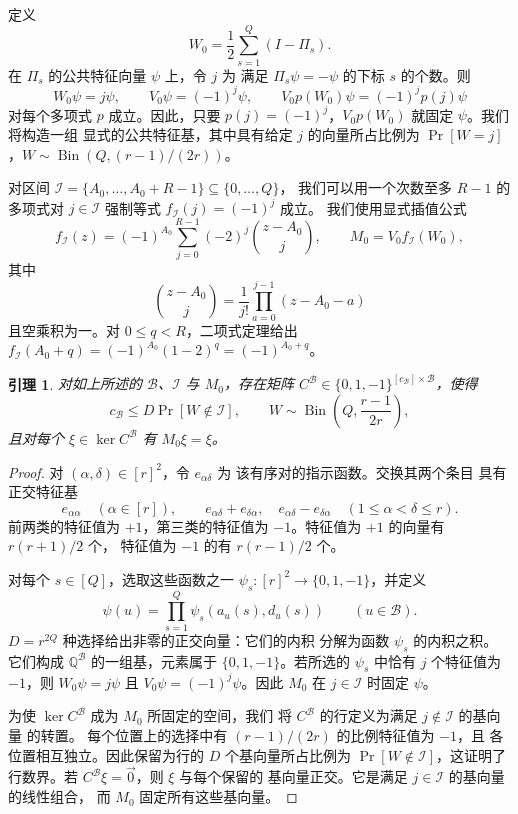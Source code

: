 \documentclass[11pt,reqno]{amsart}
\numberwithin{equation}{section}
\newtheorem{lemma}[theorem]{引理}
\theoremstyle{definition}\newtheorem{definition}[theorem]{定义}
\theoremstyle{remark}\newtheorem{remark}[theorem]{注}
\renewcommand{\le}{\leqslant}
\begin{document}
定义
\begin{equation}\label{eq:swap-weight}
 W_0=\frac12\sum_{s=1}^Q(I-\Pi_s).
\end{equation}
在 $\Pi_s$ 的公共特征向量 $\psi$ 上，令 $j$ 为
满足 $\Pi_s\psi=-\psi$ 的下标 $s$ 的个数。则
\[
 W_0\psi=j\psi,\qquad V_0\psi=(-1)^j\psi,
 \qquad V_0p(W_0)\psi=(-1)^jp(j)\psi
\]
对每个多项式 $p$ 成立。因此，只要
$p(j)=(-1)^j$，$V_0p(W_0)$ 就固定 $\psi$。我们将构造一组
显式的公共特征基，其中具有给定 $j$ 的向量所占比例为
$\Pr[W=j]$，$W\sim\operatorname{Bin}(Q,(r-1)/(2r))$。

对区间
$\mathcal I=\{A_0,\ldots,A_0+R-1\}\subseteq\{0,\ldots,Q\}$，
我们可以用一个次数至多 $R-1$ 的多项式对 $j\in\mathcal I$
强制等式 $f_{\mathcal I}(j)=(-1)^j$ 成立。
我们使用显式插值公式
\begin{equation}\label{eq:swap-matrix-definition}
 f_{\mathcal I}(z)=(-1)^{A_0}\sum_{j=0}^{R-1}(-2)^j
                          \binom{z-A_0}{j},
 \qquad M_0=V_0f_{\mathcal I}(W_0),
\end{equation}
其中
\[
 \binom{z-A_0}{j}=\frac1{j!}\prod_{a=0}^{j-1}(z-A_0-a)
\]
且空乘积为一。对 $0\le q<R$，二项式定理给出
$f_{\mathcal I}(A_0+q)=(-1)^{A_0}(1-2)^q=(-1)^{A_0+q}$。

\begin{lemma}\label{lem:swaps-matrix}
对如上所述的 $\mathcal B$、$\mathcal I$ 与 $M_0$，存在矩阵
$C^{\mathcal B}\in\{0,1,-1\}^{[c_{\mathcal B}]\times\mathcal B}$，使得
\[
 c_{\mathcal B}\le D\Pr[W\notin\mathcal I],\qquad
 W\sim\operatorname{Bin}\!\left(Q,\frac{r-1}{2r}\right),
\]
且对每个 $\xi\in\ker C^{\mathcal B}$ 有 $M_0\xi=\xi$。
\end{lemma}
\begin{proof}
对 $(\alpha,\delta)\in[r]^2$，令 $e_{\alpha\delta}$ 为
该有序对的指示函数。交换其两个条目
具有正交特征基
\[
 e_{\alpha\alpha}\quad(\alpha\in[r]),\qquad
 e_{\alpha\delta}+e_{\delta\alpha},\quad
 e_{\alpha\delta}-e_{\delta\alpha}\quad(1\le\alpha<\delta\le r).
\]
前两类的特征值为 $+1$，第三类的特征值为
$-1$。特征值为 $+1$ 的向量有 $r(r+1)/2$ 个，
特征值为 $-1$ 的有 $r(r-1)/2$ 个。

对每个 $s\in[Q]$，选取这些函数之一
$\psi_s:[r]^2\to\{0,1,-1\}$，并定义
\[
 \psi(u)=\prod_{s=1}^Q\psi_s(a_u(s),d_u(s))
 \qquad(u\in\mathcal B).
\]
$D=r^{2Q}$ 种选择给出非零的正交向量：它们的内积
分解为函数 $\psi_s$ 的内积之积。
它们构成 $\mathbb Q^{\mathcal B}$ 的一组基，元素属于
$\{0,1,-1\}$。若所选的 $\psi_s$ 中恰有 $j$ 个特征值为
$-1$，则 $W_0\psi=j\psi$ 且 $V_0\psi=(-1)^j\psi$。因此 $M_0$
在 $j\in\mathcal I$ 时固定 $\psi$。

为使 $\ker C^{\mathcal B}$ 成为 $M_0$ 所固定的空间，我们
将 $C^{\mathcal B}$ 的行定义为满足 $j\notin\mathcal I$ 的基向量
的转置。
每个位置上的选择中有 $(r-1)/(2r)$ 的比例特征值为 $-1$，且
各位置相互独立。因此保留为行的 $D$ 个基向量所占比例为
$\Pr[W\notin\mathcal I]$，这证明了行数界。若
$C^{\mathcal B}\xi=\vec{0}$，则 $\xi$ 与每个保留的
基向量正交。它是满足 $j\in\mathcal I$ 的基向量的线性组合，
而 $M_0$ 固定所有这些基向量。
\end{proof}
\end{document}
